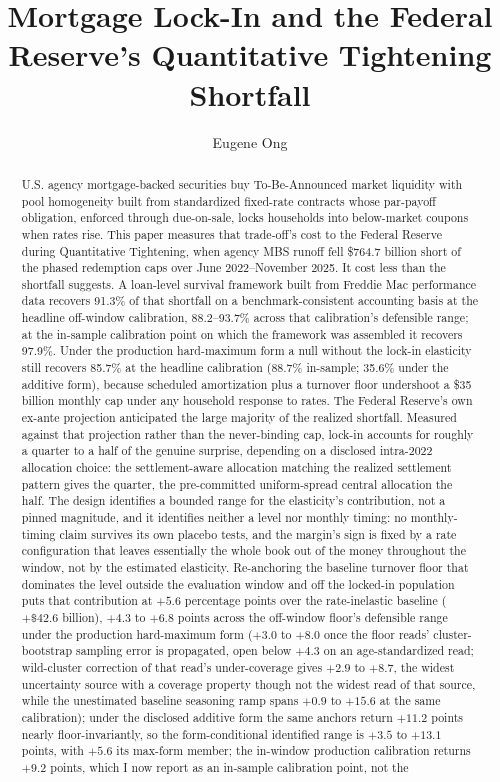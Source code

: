 \documentclass[12pt]{article}
\title{Mortgage Lock-In and the Federal Reserve's Quantitative Tightening Shortfall}
\author{Eugene Ong}
\affil{Carnegie Mellon University}
\date{}
\begin{document}
\maketitle
\begin{abstract}
\noindent U.S. agency mortgage-backed securities buy To-Be-Announced market liquidity with pool homogeneity built from standardized fixed-rate contracts whose par-payoff obligation, enforced through due-on-sale, locks households into below-market coupons when rates rise. This paper measures that trade-off's cost to the Federal Reserve during Quantitative Tightening, when agency MBS runoff fell \$764.7 billion short of the phased redemption caps over June 2022--November 2025. It cost less than the shortfall suggests. A loan-level survival framework built from Freddie Mac performance data recovers 91.3\% of that shortfall on a benchmark-consistent accounting basis at the headline off-window calibration, 88.2--93.7\% across that calibration's defensible range; at the in-sample calibration point on which the framework was assembled it recovers 97.9\%. Under the production hard-maximum form a null without the lock-in elasticity still recovers 85.7\% at the headline calibration (88.7\% in-sample; 35.6\% under the additive form), because scheduled amortization plus a turnover floor undershoot a \$35 billion monthly cap under any household response to rates. The Federal Reserve's own ex-ante projection anticipated the large majority of the realized shortfall. Measured against that projection rather than the never-binding cap, lock-in accounts for roughly a quarter to a half of the genuine surprise, depending on a disclosed intra-2022 allocation choice: the settlement-aware allocation matching the realized settlement pattern gives the quarter, the pre-committed uniform-spread central allocation the half. The design identifies a bounded range for the elasticity's contribution, not a pinned magnitude, and it identifies neither a level nor monthly timing: no monthly-timing claim survives its own placebo tests, and the margin's sign is fixed by a rate configuration that leaves essentially the whole book out of the money throughout the window, not by the estimated elasticity. Re-anchoring the baseline turnover floor that dominates the level outside the evaluation window and off the locked-in population puts that contribution at $+5.6$ percentage points over the rate-inelastic baseline ($+\$42.6$ billion), $+4.3$ to $+6.8$ points across the off-window floor's defensible range under the production hard-maximum form ($+3.0$ to $+8.0$ once the floor reads' cluster-bootstrap sampling error is propagated, open below $+4.3$ on an age-standardized read; wild-cluster correction of that read's under-coverage gives $+2.9$ to $+8.7$, the widest uncertainty source with a coverage property though not the widest read of that source, while the unestimated baseline seasoning ramp spans $+0.9$ to $+15.6$ at the same calibration); under the disclosed additive form the same anchors return $+11.2$ points nearly floor-invariantly, so the form-conditional identified range is $+3.5$ to $+13.1$ points, with $+5.6$ its max-form member; the in-window production calibration returns $+9.2$ points, which I now report as an in-sample calibration point, not the 
\end{abstract}
\end{document}
